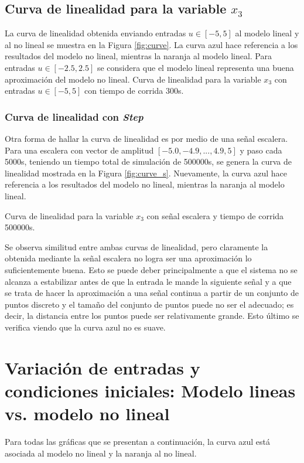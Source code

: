 \documentclass{ieeeaccess}
\begin{document}
\subsection{Curva de linealidad para la variable $x_3$}
La curva de linealidad obtenida enviando entradas $u \in [-5,5]$ al modelo lineal y al no lineal se muestra en la Figura \ref{fig:curve}. La curva azul hace referencia a los resultados del modelo no lineal, mientras la naranja al modelo lineal. Para entradas $u \in [-2.5, 2.5]$ se considera que el modelo lineal representa una buena aproximación del modelo no lineal.
       {Curva de linealidad para la variable $x_3$ con entradas $u \in [-5,5]$ con tiempo de corrida 300s.\label{fig:curve}}
       
\subsubsection{Curva de linealidad con \textit{Step}}
Otra forma de hallar la curva de linealidad es por medio de una señal escalera. Para una escalera con vector de amplitud $[-5.0, -4.9,...,4.9,5]$ y paso cada 5000s, teniendo un tiempo total de simulación de 500000s, se genera la curva de linealidad mostrada en la Figura \ref{fig:curve_s}. Nuevamente, la curva azul hace referencia a los resultados del modelo no lineal, mientras la naranja al modelo lineal.

       {Curva de linealidad para la variable $x_3$ con señal escalera y tiempo de corrida 500000s.\label{fig:curve_s}}
       
Se observa similitud entre ambas curvas de linealidad, pero claramente la obtenida mediante la señal escalera no logra ser una aproximación lo suficientemente buena. Esto se puede deber principalmente a que el sistema no se alcanza a estabilizar antes de que la entrada le mande la siguiente señal y a que se trata de hacer la aproximación a una señal continua a partir de un conjunto de puntos discreto y el tamaño del conjunto de puntos puede no ser el adecuado; es decir, la distancia entre los puntos puede ser relativamente grande. Esto último se verifica viendo que la curva azul no es suave.

\section{Variación de entradas y condiciones iniciales: Modelo lineas vs. modelo no lineal}
Para todas las gráficas que se presentan a continuación, la curva azul está asociada al modelo no lineal y la naranja al no lineal.
\end{document}
